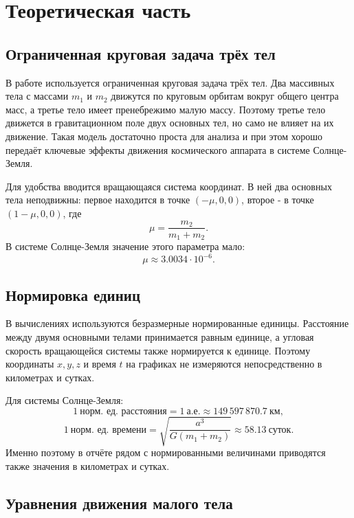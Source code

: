 \newpage
\section*{Теоретическая часть}

\subsection*{Ограниченная круговая задача трёх тел}

В работе используется ограниченная круговая задача трёх тел. Два массивных
тела с массами $m_1$ и $m_2$ движутся по круговым орбитам вокруг общего центра
масс, а третье тело имеет пренебрежимо малую массу. Поэтому третье тело
движется в гравитационном поле двух основных тел, но само не влияет на их
движение. Такая модель достаточно проста для анализа и при этом хорошо
передаёт ключевые эффекты движения космического аппарата в системе
Солнце-Земля.

Для удобства вводится вращающаяся система координат. В ней два основных тела
неподвижны: первое находится в точке $(-\mu,0,0)$, второе - в точке
$(1-\mu,0,0)$, где
\[
  \mu=\frac{m_2}{m_1+m_2}.
\]
В системе Солнце-Земля значение этого параметра мало:
\[
  \mu \approx 3.0034\cdot 10^{-6}.
\]

\subsection*{Нормировка единиц}

В вычислениях используются безразмерные нормированные единицы. Расстояние
между двумя основными телами принимается равным единице, а угловая скорость
вращающейся системы также нормируется к единице. Поэтому координаты
$x,y,z$ и время $t$ на графиках не измеряются непосредственно в километрах и
сутках.

Для системы Солнце-Земля:
\[
  1\ \text{норм. ед. расстояния} = 1\ \text{а.е.}
  \approx 149\,597\,870.7\ \text{км},
\]
\[
  1\ \text{норм. ед. времени}
  = \sqrt{\frac{a^3}{G(m_1+m_2)}} \approx 58.13\ \text{суток}.
\]
Именно поэтому в отчёте рядом с нормированными величинами приводятся также
значения в километрах и сутках.

\subsection*{Уравнения движения малого тела}

